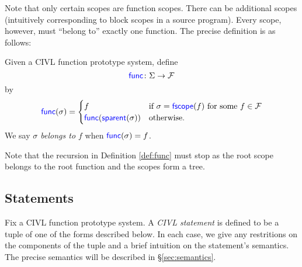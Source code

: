 \documentclass[11pt]{book}
\begin{document}
Note that only certain scopes are function scopes.  There can be
additional scopes (intuitively corresponding to block scopes in a
source program).  Every scope, however, must ``belong to'' exactly one
function.  The precise definition is as follows:
\begin{definition}
  \label{def:func}
  Given a CIVL function prototype system, define
  \[
  \textsf{\textcolor{blue}{\textup{func}}} \colon \Sigma \rightarrow \mathcal{F} 
  \]
  by
  \[
  \textsf{\textcolor{blue}{\textup{func}}}(\sigma)=
  \begin{cases}
    f & \text{if $\sigma=\textsf{\textcolor{blue}{\textup{fscope}}}(f)$ for some $f\in\mathcal{F}$}\\
    \textsf{\textcolor{blue}{\textup{func}}}(\textsf{\textcolor{blue}{\textup{sparent}}}(\sigma)) & \text{otherwise.}
  \end{cases}
  \]
  We say \emph{$\sigma$ belongs to $f$}  when $\textsf{\textcolor{blue}{\textup{func}}}(\sigma)=f$.
\end{definition}
Note that the recursion in Definition \ref{def:func} must stop as the
root scope belongs to the root function and the scopes form a tree.


\subsection{Statements}

Fix a CIVL function prototype system.  A \emph{CIVL statement} is
defined to be a tuple of one of the forms described below.
In each case, we give any restritions on the components of the tuple
and a brief intuition on the statement's semantics.  The precise
semantics will be described in \S\ref{sec:semantics}.
\end{document}
